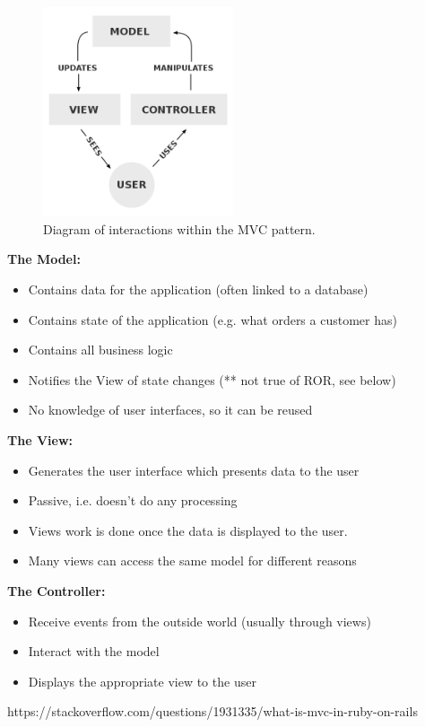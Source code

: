 \begin{figure}[H]
	\centering
    \includegraphics[trim={0 0 0 0},clip,width=0.5\textwidth]{Files/MVC.png}
    \caption{Diagram of interactions within the MVC pattern.\cite{wiki:mvc} }
    \label{fig: MVC}
\end{figure}


\textbf{The Model:}
\vspace{-5mm}
\begin{itemize}
 \setlength{\itemsep}{-5pt}
\item Contains data for the application (often linked to a database)
\item Contains state of the application (e.g. what orders a customer has)
\item  Contains all business logic
\item Notifies the View of state changes (** not true of ROR, see below)
\item No knowledge of user interfaces, so it can be reused
\end{itemize}

\textbf{The View:}
\vspace{-5mm}
\begin{itemize}
 \setlength{\itemsep}{-5pt}
\item Generates the user interface which presents data to the user
\item Passive, i.e. doesn’t do any processing
\item Views work is done once the data is displayed to the user.
\item Many views can access the same model for different reasons
\end{itemize}

\textbf{The Controller:}
\vspace{-5mm}
\begin{itemize}
 \setlength{\itemsep}{-5pt}
\item Receive events from the outside world (usually through views)
\item Interact with the model
\item Displays the appropriate view to the user
\end{itemize}

https://stackoverflow.com/questions/1931335/what-is-mvc-in-ruby-on-rails





